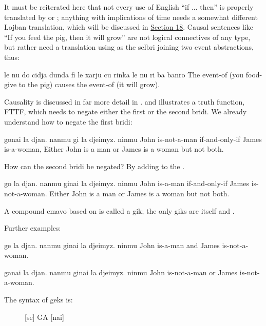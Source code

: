 It must be reiterated here that not every use of English ``if ...
    then'' is properly translated by  or ;
    anything with implications of time needs a somewhat different Lojban
    translation, which will be discussed in \hyperref[sec:14:18]{Section
    18}. Causal sentences like ``If you feed the pig, then it will
    grow'' are not logical connectives of any type, but rather need a
    translation using  as the selbri joining two event
    abstractions, thus:
\begin{example}
le nu do cidja dunda fi le xarju\n
\T	cu rinka le nu ri ba banro\n
The event-of (you food-give to the pig)\n
\T	causes the event-of (it will grow).
\end{example}

Causality is discussed in far more detail in .
 and  illustrates a truth function, FTTF, which needs to
    negate either the first or the second bridi. We already
    understand how to negate the first bridi:
\begin{example}
gonai la djan. nanmu gi la djeimyz. ninmu\n
John is-not-a-man if-and-only-if James is-a-woman,\n
Either John is a man or James is a woman but not both.
\end{example}

How can the second bridi be negated? By adding  to the
    .
\begin{example}
go la djan. nanmu ginai la djeimyz. ninmu\n
John is-a-man if-and-only-if James is-not-a-woman.\n
Either John is a man or James is a woman but not both.
\end{example}

A compound cmavo based on  is called a gik; the only giks
    are  itself and . 

Further examples:
\begin{example}
ge la djan. nanmu ginai la djeimyz. ninmu\n
John is-a-man and James is-not-a-woman.
\end{example}

\begin{example}
ganai la djan. nanmu ginai la djeimyz. ninmu\n
John is-not-a-man or James is-not-a-woman.
\end{example}

The syntax of geks is: 
\begin{description}
\item[] [se] GA [nai]
\end{description}

